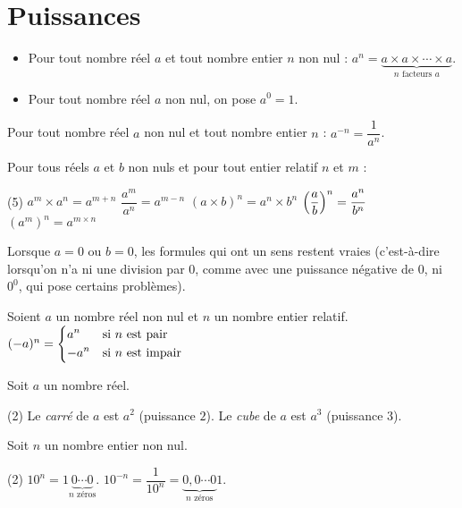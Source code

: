                 \section{Puissances}
%
%
    \begin{dfn}
        \begin{itemize}
        \item Pour tout nombre réel $a$ et tout nombre entier $n$ non nul : $a^n=\underbrace{a\times a \times \cdots\times a}_{n\text{ facteurs }a}$.
        \item Pour tout nombre réel $a$ non nul, on pose $a^0=1$.
        \end{itemize}
    \end{dfn}
%
    \begin{dfn} Pour tout nombre réel $a$ non nul et tout nombre entier $n$ : $a^{-n}=\dfrac{1}{a^n}$.
    \end{dfn}
%
    \begin{prp}[name={puissances et opérations}]
    Pour tous  réels $a$ et $b$ non nuls et pour tout  entier relatif $n$ et $m$ :
    \begin{tasks}[label=\labelitemi](5)
        \task $a^m\times a^n=a^{m+n}$
        \task $\dfrac{a^m}{a^n}=a^{m- n}$
        \task $(a\times b)^n=a^n\times b^n$
        \task $\mleft(\dfrac{a}{b}\mright)^n=\dfrac{a^n}{b^n}$
        \task $(a^m)^n=a^{m\times n}$
        \end{tasks}
    \end{prp}
%
   \begin{rmq}
   Lorsque $a=0$ ou $b=0$, les formules qui ont un sens restent vraies (c'est-à-dire lorsqu'on n'a ni une division par $0$, comme avec une puissance négative de $0$, ni $0^0$, qui pose certains problèmes).
   \end{rmq} 
%
    \begin{prp}[name={puissances et signes},newline]
    Soient $a$ un nombre réel non nul et $n$ un nombre entier relatif. %
    $(-a)^n=\begin{dcases}a^n&\text{si } n\text{ est pair}\\ -a^n& \text{si } n \text{ est impair} \end{dcases}$
    \end{prp}
%
    \begin{csp} Soit $a$ un nombre réel.
    \begin{tasks}[label=\labelitemi](2)
        \task Le \emph{carré} de $a$ est $a^2$ (puissance $2$).
        \task Le \emph{cube} de $a$ est $a^3$ (puissance $3$).
        \end{tasks}
    \end{csp}
%
    \begin{csp} Soit $n$ un nombre entier non nul.
    \begin{tasks}[label=\labelitemi](2)
        \task $10^n=1\underbrace{0\cdots0}_{n\text{ zéros}}$.
        \task $10^{-n}=\dfrac{1}{10^n}=\underbrace{0,0\cdots0}_{n\text{ zéros}}1$.
        \end{tasks}
    \end{csp}
%
%
